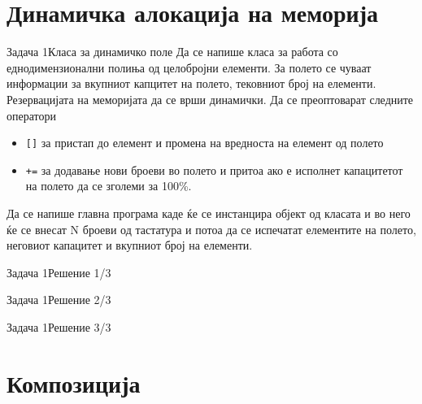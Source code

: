\section{Динамичка алокација на меморија}

\begin{frame}{Задача 1}{Класа за динамичко поле}
Да се напише класа за работа со еднодимензионални полиња од целобројни елементи.
За полето се чуваат информации за вкупниот капцитет на полето, тековниот број на
елементи. Резервацијата на меморијата да се врши динамички. 
Да се преоптоварат следните оператори 
\begin{itemize}
  \item \texttt{[]} за пристап до елемент и промена на вредноста на
  елемент од полето
  \item \texttt{+=} за додавање нови броеви во полето и притоа ако е исполнет
  капацитетот на полето да се зголеми за 100\%.
\end{itemize}
Да се напише главна програма каде ќе се инстанцира објект од класата и во него
ќе се внесат N броеви од тастатура и потоа да се испечатат елементите на полето,
неговиот капацитет и вкупниот број на елементи.
\end{frame}

\begin{frame}[fragile]{Задача 1}{Решение 1/3}

\end{frame}

\begin{frame}[fragile]{Задача 1}{Решение 2/3}

\end{frame}

\begin{frame}[fragile]{Задача 1}{Решение 3/3}

\end{frame}

\section{Композиција}

